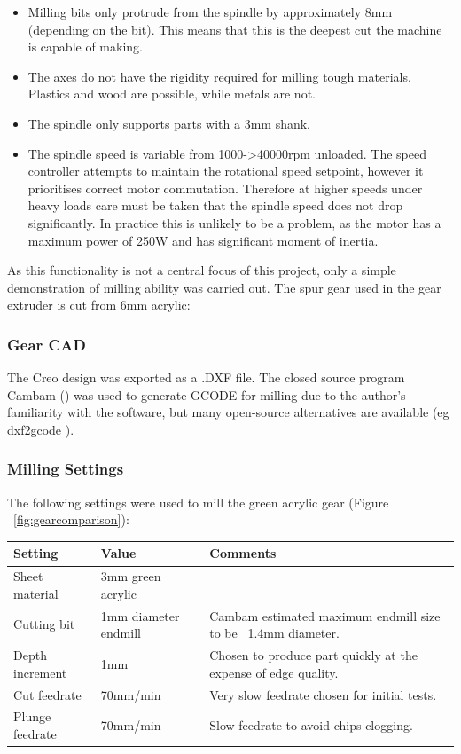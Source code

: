 \begin{itemize} \itemsep0em
	\item	Milling bits only protrude from the spindle by approximately 8mm (depending on the bit). This means that this is the deepest cut the machine is capable of making.
	\item	The axes do not have the rigidity required for milling tough materials. Plastics and wood are possible, while metals are not.
	\item	The spindle only supports parts with a 3mm shank.
	\item	The spindle speed is variable from 1000-\textgreater40000rpm unloaded. The speed controller attempts to maintain the rotational speed setpoint, however it prioritises
			correct motor commutation. Therefore at higher speeds under heavy loads care must be taken that the spindle speed does not drop significantly. In practice this is unlikely
			to be a problem, as the motor has a maximum power of 250W and has significant moment of inertia.
\end{itemize}

As this functionality is not a central focus of this project, only a simple demonstration of milling ability was carried out. The spur gear used in the gear extruder is cut from 6mm acrylic:

\subsubsection {Gear CAD}
The Creo design was exported as a .DXF file. The closed source program Cambam (\cite{Cambam}) was used to generate
GCODE for milling due to the author's familiarity with the software, but many open-source alternatives are available
(eg dxf2gcode \cite{dxf2gcode}).

\subsubsection {Milling Settings}

The following settings were used to mill the green acrylic gear (Figure ~\ref{fig:gearcomparison}):

\begin{center}
	\begin{tabular}{| l | l | p{8cm} |}
	\hline
	Setting & Value & Comments \\ \hline
	Sheet material & 3mm green acrylic & \\ \hline
	Cutting bit & 1mm diameter endmill & Cambam estimated maximum endmill size to be ~1.4mm diameter. \\ \hline
	Depth increment & 1mm & Chosen to produce part quickly at the expense of edge quality. \\ \hline
	Cut feedrate & 70mm/min & Very slow feedrate chosen for initial tests. \\ \hline
	Plunge feedrate & 70mm/min & Slow feedrate to avoid chips clogging.\\
	\hline
	\end{tabular}
\end{center}

